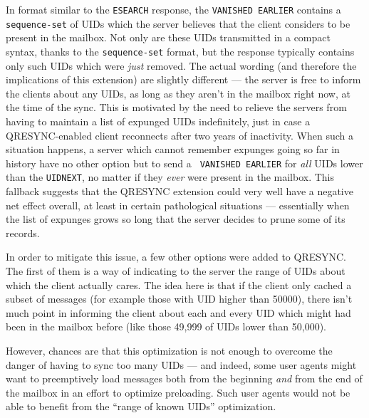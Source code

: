 \documentclass[trojita]{subfiles}
\begin{document}
In format similar to the {\tt ESEARCH} response, the {\tt VANISHED EARLIER} contains a {\tt sequence-set} of UIDs which
the server believes that the client considers to be present in the mailbox.  Not only are these UIDs transmitted in a
compact syntax, thanks to the {\tt sequence-set} format, but the response typically contains only such UIDs which were
{\em just} removed.  The actual wording (and therefore the implications of this extension) are slightly different --- the
server is free to inform the clients about any UIDs, as long as they aren't in the mailbox right now, at the time of the
sync.  This is motivated by the need to relieve the servers from having to maintain a list of expunged UIDs
indefinitely, just in case a QRESYNC-enabled client reconnects after two years of inactivity.  When such a situation
happens, a server which cannot remember expunges going so far in history have no other option but to send a {\tt
VANISHED EARLIER} for {\em all} UIDs lower than the {\tt UIDNEXT}, no matter if they {\em ever} were present in the
mailbox.  This fallback suggests that the QRESYNC extension could very well have a negative net effect overall, at least
in certain pathological situations --- essentially when the list of expunges grows so long that the server decides to
prune some of its records.

In order to mitigate this issue, a few other options were added to QRESYNC.  The first of them is a way of indicating to
the server the range of UIDs about which the client actually cares.  The idea here is that if the client only cached a
subset of messages (for example those with UID higher than 50000), there isn't much point in informing the client about
each and every UID which might had been in the mailbox before (like those 49,999 of UIDs lower than 50,000).

However, chances are that this optimization is not enough to overcome the danger of having to sync too many UIDs --- and
indeed, some user agents might want to preemptively load messages both from the beginning {\em and} from the end of the
mailbox in an effort to optimize preloading.  Such user agents would not be able to benefit from the ``range of known
UIDs'' optimization.
\end{document}
